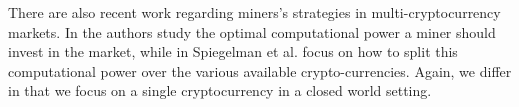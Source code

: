 There are also recent work regarding miners's strategies in multi-cryptocurrency markets. In \cite{dhamal2018stochastic} the authors study the optimal computational power a miner should invest in the market, while in \cite{spiegelman2018game} Spiegelman et al. focus on how to split this computational power over the various available crypto-currencies. Again, we differ in that we focus on a single cryptocurrency in a closed world setting.
